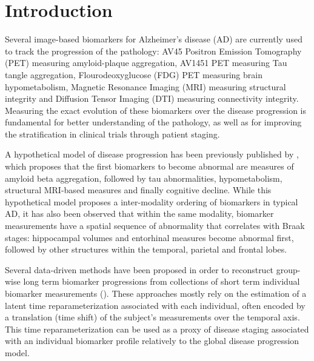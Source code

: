 \documentclass{llncs}
\begin{document}
\section{Introduction}


Several image-based biomarkers for Alzheimer's disease (AD) are currently used to track the progression of the pathology: AV45 Positron Emission Tomography (PET) measuring amyloid-plaque aggregation, AV1451 PET measuring Tau tangle aggregation, Flourodeoxyglucose (FDG) PET measuring brain hypometabolism, Magnetic Resonance Imaging (MRI) measuring structural integrity and Diffusion Tensor Imaging (DTI) measuring connectivity integrity. Measuring the exact evolution of these biomarkers over the disease progression is fundamental for better understanding of the pathology, as well as for improving the stratification in clinical trials through patient staging.

A hypothetical model of disease progression has been previously published by \cite{jack2010hypothetical}, which proposes that the first biomarkers to become abnormal are measures of amyloid beta aggregation, followed by tau abnormalities, hypometabolism, structural MRI-based measures and finally cognitive decline. While this hypothetical model proposes a inter-modality ordering of biomarkers in typical AD, it has also been observed that within the same modality, biomarker measurements have a spatial sequence of abnormality that correlates with Braak stages: hippocampal volumes and entorhinal measures become abnormal first, followed by other structures within the temporal, parietal and frontal lobes.

Several data-driven methods have been proposed in order to reconstruct group-wise long term biomarker progressions from collections of short term individual biomarker measurements (\cite{lorenzi2017disease,young2014data,donohue2014estimating}). These approaches mostly rely on the estimation of a latent time reparameterization associated with each individual, often encoded by a translation (time shift) of the subject's measurements over the temporal axis.  This time reparameterization can be used as a proxy of disease staging associated with an individual biomarker profile relatively to the global disease progression model. 
\end{document}
